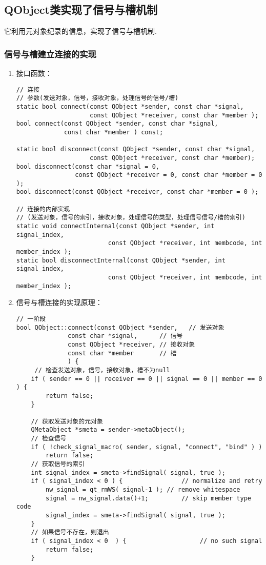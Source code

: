 \documentclass[9pt,b5paper]{article}
\begin{document}
\subsection{QObject类实现了信号与槽机制}
\label{sec-4-2}
它利用元对象纪录的信息，实现了信号与槽机制.
\subsubsection{信号与槽建立连接的实现}
\label{sec-4-2-1}
\begin{enumerate}
\item 接口函数：
\label{sec-4-2-1-1}
\lstset{language=c++,label= ,caption= ,numbers=none}
\begin{lstlisting}
// 连接  
// 参数(发送对象，信号，接收对象，处理信号的信号/槽)
static bool connect(const QObject *sender, const char *signal,  
				    const QObject *receiver, const char *member );  
bool connect(const QObject *sender, const char *signal,  
		     const char *member ) const;

static bool disconnect(const QObject *sender, const char *signal,  
					const QObject *receiver, const char *member);  
bool disconnect(const char *signal = 0,  
				const QObject *receiver = 0, const char *member = 0 );  
bool disconnect(const QObject *receiver, const char *member = 0 );

// 连接的内部实现  
// (发送对象，信号的索引，接收对象，处理信号的类型，处理信号信号/槽的索引)    
static void connectInternal(const QObject *sender, int signal_index,  
						 const QObject *receiver, int membcode, int member_index );  
static bool disconnectInternal(const QObject *sender, int signal_index,  
						 const QObject *receiver, int membcode, int member_index );
\end{lstlisting}
\item 信号与槽连接的实现原理：
\label{sec-4-2-1-2}
\lstset{language=c++,label= ,caption= ,numbers=none}
\begin{lstlisting}
// 一阶段  
bool QObject::connect(const QObject *sender,   // 发送对象        
		      const char *signal,      // 信号  
		      const QObject *receiver, // 接收对象  
		      const char *member       // 槽  
		      ) { 
     // 检查发送对象，信号，接收对象，槽不为null  
    if ( sender == 0 || receiver == 0 || signal == 0 || member == 0 ) {        
	    return false;  
    }

    // 获取发送对象的元对象  
    QMetaObject *smeta = sender->metaObject();  
    // 检查信号  
    if ( !check_signal_macro( sender, signal, "connect", "bind" ) )  
	    return false;     
    // 获取信号的索引  
    int signal_index = smeta->findSignal( signal, true );  
    if ( signal_index < 0 ) {                // normalize and retry  
	    nw_signal = qt_rmWS( signal-1 ); // remove whitespace  
	    signal = nw_signal.data()+1;         // skip member type code  
	    signal_index = smeta->findSignal( signal, true );  
    }  
    // 如果信号不存在，则退出  
    if ( signal_index < 0  ) {                    // no such signal  
	    return false;  
    }  


\end{lstlisting}
\end{enumerate}
\end{document}
